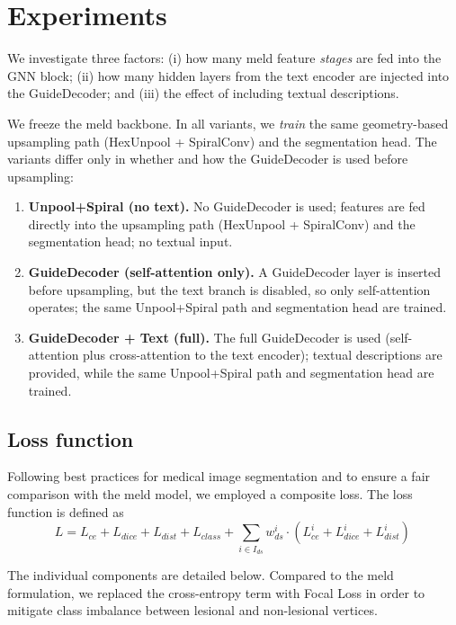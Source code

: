 \documentclass[FCD_GNN.tex]{subfiles}
\begin{document}
\chapter{Experiments}
\label{chapter:Experiments}

We investigate three factors: (i) how many \ac{meld} feature \emph{stages} are fed into the GNN block; (ii) how many hidden layers from the text encoder are injected into the GuideDecoder; and (iii) the effect of including textual descriptions. 

We freeze the \ac{meld} backbone. In all variants, we \emph{train} the same geometry-based upsampling path
(HexUnpool + SpiralConv) and the segmentation head. The variants differ only in whether and how
the GuideDecoder is used before upsampling:

\begin{enumerate}
  \item \textbf{Unpool+Spiral (no text).} No GuideDecoder is used; features are fed directly into the
        upsampling path (HexUnpool + SpiralConv) and the segmentation head; no textual input.
  \item \textbf{GuideDecoder (self-attention only).} A GuideDecoder layer is inserted before upsampling,
        but the text branch is disabled, so only self-attention operates; the same Unpool+Spiral path and
        segmentation head are trained.
  \item \textbf{GuideDecoder + Text (full).} The full GuideDecoder is used (self-attention plus
        cross-attention to the text encoder); textual descriptions are provided, while the same
        Unpool+Spiral path and segmentation head are trained.
\end{enumerate}

\section{Loss function}
Following best practices for medical image segmentation and to ensure a fair comparison with the \ac{meld} model, we employed a composite loss. The loss function is defined as
\begin{equation}
L = L_{ce} + L_{dice} + L_{dist} + L_{class} + \sum_{i \in I_{ds}} w^i_{ds} \cdot (L^i_{ce} + L^i_{dice} + L^i_{dist})\,
\end{equation}
\par\noindent
The individual components are detailed below. Compared to the \ac{meld} formulation, we replaced the cross-entropy term with Focal Loss in order to mitigate class imbalance between lesional and non-lesional vertices.
\end{document}
